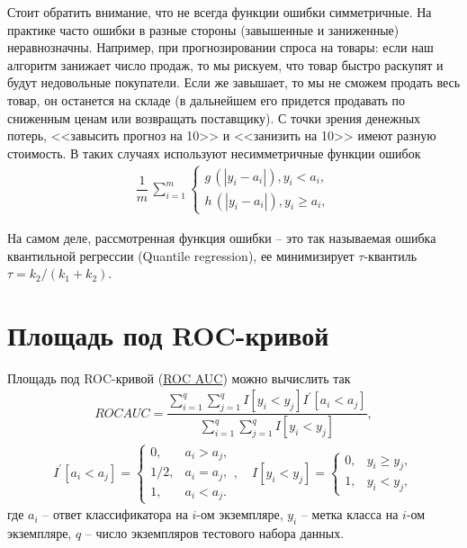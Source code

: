 \documentclass[%
	11pt,
	a4paper,
	utf8,
		]{article}
\begin{document}
Стоит обратить внимание, что не всегда функции ошибки симметричные. На практике часто ошибки в разные стороны (завышенные и заниженные) неравнозначны. Например, при прогнозировании спроса на товары: если наш алгоритм занижает число продаж, то мы рискуем, что товар быстро раскупят и будут недовольные покупатели. Если же завышает, то мы не сможем продать весь товар, он останется на складе (в дальнейшем его придется продавать по сниженным ценам или возвращать поставщику). С точки зрения денежных потерь, <<завысить прогноз на 10>> и <<занизить на 10>> имеют разную стоимость. В таких случаях используют несимметричные функции ошибок
\begin{align*}
	\dfrac{1}{m} \, \sum_{i=1}^{m}
	\begin{cases}
		g\, (| y_i - a_i |), y_i < a_i,\\
		h\, (| y_i - a_i |), y_i \geqslant a_i,
	\end{cases}
\end{align*}

На самом деле, рассмотренная функция ошибки -- это так называемая ошибка квантильной регрессии (Quantile regression), ее минимизирует $ \tau $-квантиль $ \tau = k_2 / (k_1 + k_2) $.


\section{Площадь под ROC-кривой}

Площадь под ROC-кривой (\href{https://dyakonov.org/2017/07/28/auc-roc-площадь-под-кривой-ошибок/}{ROC AUC}) можно вычислить так
\begin{align*}
	ROC AUC = \dfrac{ \sum\limits_{i=1}^{q}\sum\limits_{j=1}^{q} I[y_i < y_j] I^{'}[a_i < a_j]}{ \sum\limits_{i=1}^{q}\sum\limits_{j=1}^{q} I[y_i < y_j] },
\end{align*}
\vspace*{-5mm}
\begin{align*}
	I^{'}[a_i < a_j] =
	    \begin{cases}
		    0, &a_i > a_j,\\
		    1/2, &a_i = a_j,\\
		    1, &a_i < a_j.
		\end{cases}, \quad I[y_i < y_j] = 
	        \begin{cases}
	        	0, &y_i \geqslant y_j,\\
	        	1, &y_i < y_j,
	        \end{cases}
\end{align*}
где $ a_i $ -- ответ классификатора на $ i $-ом экземпляре, $ y_i $ -- метка класса на $ i $-ом экземпляре, $ q $ -- число экземпляров тестового набора данных.
\end{document}
